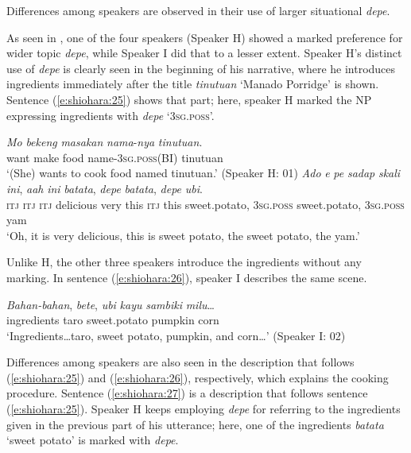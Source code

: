 \documentclass[output=paper
,modfonts
,nonflat]{langsci/langscibook}
\begin{document}
\noindent
Differences among speakers are observed in their use of larger situational \textit{depe}. 

As seen in , one of the four speakers (Speaker H) showed a marked preference for wider topic \textit{depe}, while Speaker I did that to a lesser extent. Speaker H’s distinct use of \textit{depe} is clearly seen in the beginning of his narrative, where he introduces ingredients immediately after the title \textit{tinutuan} ‘Manado Porridge’ is shown. Sentence (\ref{e:shiohara:25}) shows that part; here, speaker H marked the NP expressing ingredients with \textit{depe} ‘\textsc{3sg.poss}’.

\begin{exe}
	\ex\label{e:shiohara:25}
	\begin{xlist}
		\ex\label{e:shiohara:25a}
		\gll \textit{Mo} \textit{bekeng} \textit{masakan} \textit{nama}-\textit{nya} \textit{tinutuan}.\\
		want make food name-\textsc{3sg}.\textsc{poss(BI)} tinutuan\\
		\glt ‘(She) wants to cook food named tinutuan.’ \hfill{(Speaker H: 01)}
		\ex\label{e:shiohara:25b}
		\gll \textit{Ado} \textit{e} \textit{pe} \textit{sadap} \textit{skali} \textit{ini}, \textit{aah} \textit{ini} \textit{batata}, \textit{depe} \textit{batata}, \textit{depe} \textit{ubi}.\\
		\textsc{itj} \textsc{itj} \textsc{itj} delicious very this \textsc{itj} this sweet.potato, \textsc{3sg.poss} sweet.potato, \textsc{3sg.poss} yam\\
		\glt ‘Oh, it is very delicious, this is sweet potato, the sweet potato, the yam.’
	\end{xlist}
\end{exe}

\noindent
Unlike H, the other three speakers introduce the ingredients without any marking. In sentence (\ref{e:shiohara:26}), speaker I describes the same scene.

\begin{exe}
	\ex\label{e:shiohara:26}
	\gll \textit{Bahan-bahan},  \textit{bete},  {\textit{ubi} \textit{kayu}}  \textit{sambiki}  \textit{milu}…\\
	ingredients    taro  sweet.potato  pumpkin  corn\\
	\glt ‘Ingredients…taro, sweet potato, pumpkin, and corn…’ \hfill{(Speaker I: 02)}
\end{exe}

\noindent
Differences among speakers are also seen in the description that follows (\ref{e:shiohara:25}) and (\ref{e:shiohara:26}), respectively, which explains the cooking procedure. Sentence (\ref{e:shiohara:27}) is a description that follows sentence (\ref{e:shiohara:25}). Speaker H keeps employing \textit{depe} for referring to the ingredients given in the previous part of his utterance; here, one of the ingredients \textit{batata} ‘sweet potato’ is marked with \textit{depe}.
\end{document}
